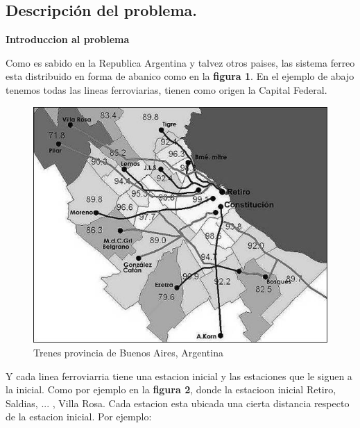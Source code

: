 \subsection{Descripción del problema.}

\vspace*{0.3cm}



\textbf{Introduccion al problema} \newline

Como es sabido en la Republica Argentina y talvez otros paises, las sistema ferreo esta distribuido en forma de abanico como en la \textbf{figura 1}.
En el ejemplo de abajo tenemos todas las lineas ferroviarias, tienen como origen la Capital Federal.
\begin{figure}[htb]
	\begin{center}
		\includegraphics[scale=0.50]{imagenes/red-trenes.jpg}
	\end{center}
	\caption{Trenes provincia de Buenos Aires, Argentina}
\end{figure}
Y cada linea ferroviarria tiene una estacion inicial y las estaciones que le siguen a la inicial. Como por ejemplo en la \textbf{figura 2}, donde la estacioon inicial Retiro, Saldias, ... , Villa Rosa. 
Cada estacion esta ubicada una cierta distancia respecto de la estacion inicial.
Por ejemplo:

